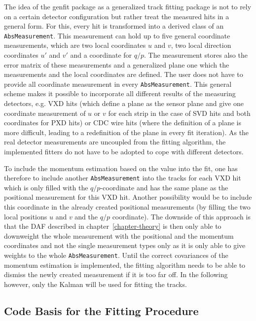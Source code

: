 The idea of the genfit package as a generalized track fitting package is not to rely on a certain detector configuration but rather treat the measured hits in a general form. For this, every hit is transformed into a derived class of an \texttt{AbsMeasurement}. This measurement can hold up to five general coordinate measurements, which are two local coordinates $u$ and $v$, two local direction coordinates $u'$ and $v'$ and a coordinate for $q/p$. The measurement stores also the error matrix of these measurements and a generalized plane one which the measurements and the local coordinates are defined. The user does not have to provide all coordinate measurement in every \texttt{AbsMeasurement}. This general scheme makes it possible to incorporate all different results of the measuring detectors, e.g. VXD hits (which define a plane as the sensor plane and give one coordinate measurement of $u$ or $v$ for each strip in the case of SVD hits and both coordinates for PXD hits) or CDC wire hits (where the definition of a plane is more difficult, leading to a redefinition of the plane in every fit iteration). As the real detector measurements are uncoupled from the fitting algorithm, the implemented fitters do not have to be adopted to cope with different detectors.

To include the momentum estimation based on the \dedx value into the fit, one has therefore to include another \texttt{AbsMeasurement} into the tracks for each VXD hit which is only filled with the $q/p$-coordinate and has the same plane as the positional measurement for this VXD hit. Another possibility would be to include this coordinate in the already created positional measurements (by filling the two local positions $u$ and $v$ and the $q/p$ coordinate). The downside of this approach is that the DAF described in chapter~\ref{chapter-theory} is then only able to downweight the whole measurement with the positional and the momentum coordinates and not the single measurement types only as it is only able to give weights to the whole \texttt{AbsMeasurement}. Until the correct covariances of the momentum estimation is implemented, the fitting algorithm needs to be able to dismiss the newly created measurement if it is too far off. In the following however, only the Kalman will be used for fitting the tracks.

\subsection{Code Basis for the Fitting Procedure}


